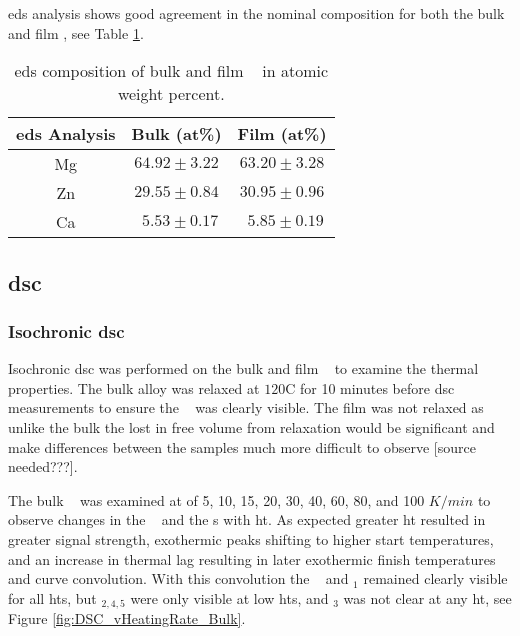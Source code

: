 \documentclass[a4paper,12pt,oneside]{article}%
\begin{document}
\acrshort{eds} analysis shows good agreement in the nominal composition for both the bulk and film \MgZnCa, see Table \ref{tab:EDS_Composition}.

\begin{table}[h]
	\centering
	\caption{\acrshort{eds} composition of bulk and film \MgZnCa~ in atomic weight percent.}
	\begin{tabular}{ c c c }
		\toprule
		\acrshort{eds} Analysis & Bulk (at\%)  & Film (at\%)  \\
		\midrule
		Mg & $64.92 \pm 3.22$ & $63.20 \pm 3.28$ \\
		Zn & $29.55 \pm 0.84$ & $30.95 \pm 0.96$ \\
		Ca & $~~ 5.53 \pm 0.17$ & $~~ 5.85 \pm 0.19$ \\ 
		\bottomrule
	\end{tabular}
	\label{tab:EDS_Composition}
\end{table}

\subsection{\acrshort{dsc}}
\subsubsection{Isochronic \acrshort{dsc}}
Isochronic \acrshort{dsc} was performed on the bulk and film \MgZnCa~ to examine the thermal properties. The bulk alloy was relaxed at $120$\degree C for 10 minutes before \acrshort{dsc} measurements to ensure the \Tg~ was clearly visible. The film was not relaxed as unlike the bulk the lost in free volume from relaxation would be significant and make differences between the samples much more difficult to observe [source needed???]. 

The bulk \MgZnCa~ was examined at  of 5, 10, 15, 20, 30, 40, 60, 80, and 100 $K/min$ to observe changes in the \Tg~ and the \Tx s with \gls{ht}. As expected greater \gls{ht} resulted in greater signal strength, exothermic peaks shifting to higher start temperatures, and an increase in thermal lag resulting in later exothermic finish temperatures and curve convolution. With this convolution the \Tg~ and \Tx $_{1}$  remained clearly visible for all \glspl{ht}, but \Tx $_{2,4,5}$ were only visible at low \glspl{ht}, and \Tx $_{3}$ was not clear at any \gls{ht}, see Figure \ref{fig:DSC_vHeatingRate_Bulk}.
\end{document}

